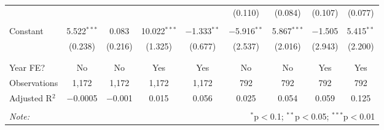 \begin{sidewaystable}[!htbp]
\begin{tabular}{@{\extracolsep{0pt}}lcccccccc}
  &  &  &  &  & (0.110) & (0.084) & (0.107) & (0.077) \\ 
  & & & & & & & & \\ 
 Constant & 5.522$^{***}$ & 0.083 & 10.022$^{***}$ & $-$1.333$^{**}$ & $-$5.916$^{**}$ & 5.867$^{***}$ & $-$1.505 & 5.415$^{**}$ \\ 
  & (0.238) & (0.216) & (1.325) & (0.677) & (2.537) & (2.016) & (2.943) & (2.200) \\ 
  & & & & & & & & \\ 
\hline \\[-1.8ex] 
Year FE? & No & No & Yes & Yes & No & No & Yes & Yes \\ 
Observations & 1,172 & 1,172 & 1,172 & 1,172 & 792 & 792 & 792 & 792 \\ 
Adjusted R$^{2}$ & $-$0.0005 & $-$0.001 & 0.015 & 0.056 & 0.025 & 0.054 & 0.059 & 0.125 \\ 
\hline 
\hline \\[-1.8ex] 
\textit{Note:}  & \multicolumn{8}{r}{$^{*}$p$<$0.1; $^{**}$p$<$0.05; $^{***}$p$<$0.01} \\ 
\end{tabular} 
\end{sidewaystable} 
